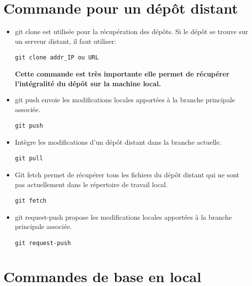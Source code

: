 \documentclass[french, 12pt]{article}%
\newcommand{\itemE}{\item[$\bullet$]}
\begin{document}
\section{Commande pour un dépôt distant}
\begin{itemize}
\itemE git clone est utilisée pour la récupération des dépôts. Si le dépôt se trouve sur un serveur distant, il faut utiliser:
\begin{lstlisting}[style=commande]
git clone addr_IP ou URL
\end{lstlisting}

\textbf{Cette commande est très importante elle permet de récupérer l'intégralité du dépôt sur la machine local.}


\vspace{0.5cm}

\itemE git push envoie les modifications locales apportées à la branche principale associée.
\begin{lstlisting}[style=commande]
git push
\end{lstlisting}

\itemE Intègre les modifications d’un dépôt distant dans la branche actuelle.
\begin{lstlisting}[style=commande]
git pull
\end{lstlisting}

\itemE Git fetch permet de récupérer tous les fichiers du dépôt distant qui ne sont pas actuellement dans le répertoire de travail local.
\begin{lstlisting}[style=commande]
git fetch
\end{lstlisting}

\itemE git request-push propose les modifications locales apportées à la branche principale associée.
\begin{lstlisting}[style=commande]
git request-push
\end{lstlisting}


\end{itemize}

\section{Commandes de base en local}
\end{document}

